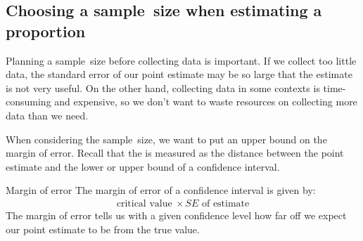 \D{\newpage}

\subsection{Choosing a sample~size when estimating a proportion}
\label{moeproportion}

Planning a sample~size before collecting data is important. If we collect too little data, the standard error of our point estimate may be so large that the estimate is not very useful. On the other hand, collecting data in some contexts is time-consuming and expensive, so we don't want to waste resources on collecting more data than we need.

When considering the sample~size, we want to put an upper bound on the margin of error. Recall that the  is measured as the distance between the point estimate and the lower or upper bound of a confidence interval.  

\begin{onebox}{Margin of error}
The margin of error of a confidence interval is given by: 
\begin{align*}
\text{critical value} \ \times SE \text{ of estimate} 
\end{align*}
The margin of error tells us with a given confidence level how far off we expect our point estimate to be from the true value.
\end{onebox}



